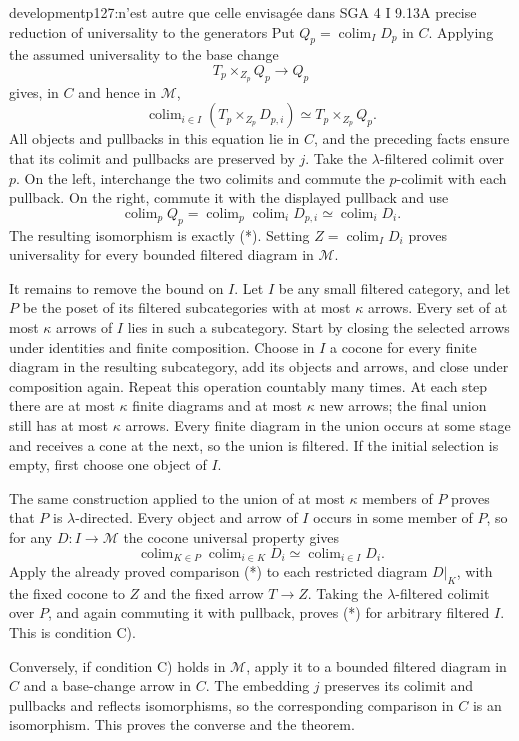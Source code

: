 \begin{dcomment}{development}{p127:n'est autre que celle envisagée dans SGA 4 I 9.13}{A precise reduction of universality to the generators}
Put $Q_p=\operatorname{colim}_I D_p$ in $C$. Applying the assumed universality to the base change
\[
 T_p\times_{Z_p}Q_p\longrightarrow Q_p
\]
gives, in $C$ and hence in $\mathcal M$,
\[
 \operatorname{colim}_{i\in I}(T_p\times_{Z_p}D_{p,i})
   \simeq T_p\times_{Z_p}Q_p.
\]
All objects and pullbacks in this equation lie in $C$, and the preceding facts ensure that its colimit and pullbacks are preserved by $j$. Take the $\lambda$-filtered colimit over $p$. On the left, interchange the two colimits and commute the $p$-colimit with each pullback. On the right, commute it with the displayed pullback and use
\[
 \operatorname{colim}_p Q_p
   =\operatorname{colim}_p\operatorname{colim}_i D_{p,i}
   \simeq\operatorname{colim}_i D_i.
\]
The resulting isomorphism is exactly (*). Setting $Z=\operatorname{colim}_I D_i$ proves universality for every bounded filtered diagram in $\mathcal M$.

It remains to remove the bound on $I$. Let $I$ be any small filtered category, and let $P$ be the poset of its filtered subcategories with at most $\kappa$ arrows. Every set of at most $\kappa$ arrows of $I$ lies in such a subcategory. Start by closing the selected arrows under identities and finite composition. Choose in $I$ a cocone for every finite diagram in the resulting subcategory, add its objects and arrows, and close under composition again. Repeat this operation countably many times. At each step there are at most $\kappa$ finite diagrams and at most $\kappa$ new arrows; the final union still has at most $\kappa$ arrows. Every finite diagram in the union occurs at some stage and receives a cone at the next, so the union is filtered. If the initial selection is empty, first choose one object of $I$.

The same construction applied to the union of at most $\kappa$ members of $P$ proves that $P$ is $\lambda$-directed. Every object and arrow of $I$ occurs in some member of $P$, so for any $D:I\to\mathcal M$ the cocone universal property gives
\[
 \operatorname{colim}_{K\in P}\operatorname{colim}_{i\in K}D_i
   \simeq\operatorname{colim}_{i\in I}D_i.
\]
Apply the already proved comparison (*) to each restricted diagram $D|_K$, with the fixed cocone to $Z$ and the fixed arrow $T\to Z$. Taking the $\lambda$-filtered colimit over $P$, and again commuting it with pullback, proves (*) for arbitrary filtered $I$. This is condition C).

Conversely, if condition C) holds in $\mathcal M$, apply it to a bounded filtered diagram in $C$ and a base-change arrow in $C$. The embedding $j$ preserves its colimit and pullbacks and reflects isomorphisms, so the corresponding comparison in $C$ is an isomorphism. This proves the converse and the theorem.


\end{dcomment}
